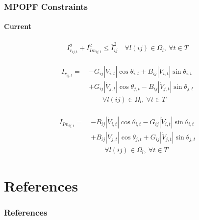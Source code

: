 \documentclass[
	11pt, %
	aspectratio=169, %
]{beamer}
\begin{document}
\begin{frame}
	\frametitle{MPOPF Constraints}
	\framesubtitle{Current} %

	\begin{align}
	\label{eq:Mcons_current}
		I_{r_{ij,t}}^{2}+ I_{Im_{ij,t}}^{2} \leq \overline{I}_{ij}^{2} \quad   \forall l(ij) \in \Omega_{l},\ \forall t \in T
	\end{align}

	\begin{align}
	\label{eq:Mexpr_i_re}
		\begin{split}
			I_{r_{ij,t}} =\ &-G_{ij}\left\lvert \dot{V}_{i,t} \right\rvert \cos{\theta_{i,t}} + B_{ij}\left\lvert \dot{V}_{i,t} \right\rvert \sin{\theta_{i,t}} \\
					&+ G_{ij}\left\lvert \dot{V}_{j,t} \right\rvert \cos{\theta_{j,t}} - B_{ij}\left\lvert \dot{V}_{j,t} \right\rvert \sin{\theta_{j,t}} \\
			&\qquad \forall l(ij) \in \Omega_{l},\  \forall t \in T
		\end{split}
	\end{align}

	\begin{align}
	\label{eq:Mexpr_i_imag}
		\begin{split}
			I_{Im_{ij,t}} =\ &-B_{ij}\left\lvert \dot{V}_{i,t} \right\rvert \cos{\theta_{i,t}} - G_{ij}\left\lvert \dot{V}_{i,t} \right\rvert \sin{\theta_{i,t}} \\
			&+ B_{ij}\left\lvert \dot{V}_{j,t} \right\rvert \cos{\theta_{j,t}} + G_{ij}\left\lvert \dot{V}_{j,t} \right\rvert \sin{\theta_{j,t}} \\
			&\qquad \forall l(ij) \in \Omega_{l},\ \forall t \in T
		\end{split}
	\end{align}

\end{frame}
	


\section{References}


\begin{frame} %
	\frametitle{References}
	
	\printbibliography
	
	
\end{frame}
\end{document}
